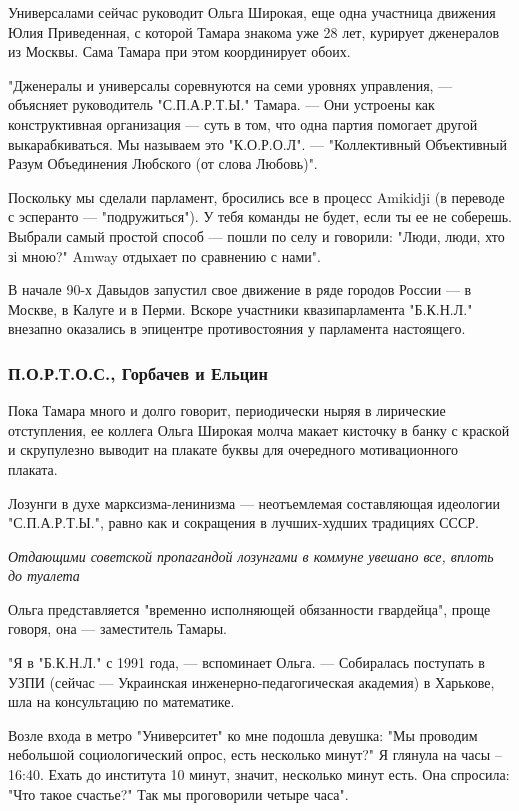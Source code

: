 Универсалами сейчас руководит Ольга Широкая, еще одна участница движения Юлия
Приведенная, с которой Тамара знакома уже 28 лет, курирует дженералов из
Москвы. Сама Тамара при этом координирует обоих.

"Дженералы и универсалы соревнуются на семи уровнях управления, --- объясняет
руководитель "С.П.А.Р.Т.Ы." Тамара. --- Они устроены как конструктивная
организация --- суть в том, что одна партия помогает другой выкарабкиваться. Мы
называем это "К.О.Р.О.Л". --- "Коллективный Объективный Разум Объединения
Любского (от слова Любовь)". 

Поскольку мы сделали парламент, бросились все в процесс Amikidji (в переводе с
эсперанто --- "подружиться"). У тебя команды не будет, если ты ее не соберешь.
Выбрали самый простой способ --- пошли по селу и говорили: "Люди, люди, хто зі
мною?" Amway отдыхает по сравнению с нами".

В начале 90-х Давыдов запустил свое движение в ряде городов России --- в Москве,
в Калуге и в Перми. Вскоре участники квазипарламента "Б.К.Н.Л." внезапно
оказались в эпицентре противостояния у парламента настоящего.

\subsubsection{П.О.Р.Т.О.С., Горбачев и Ельцин}

Пока Тамара много и долго говорит, периодически ныряя в лирические отступления,
ее коллега Ольга Широкая молча макает кисточку в банку с краской и скрупулезно
выводит на плакате буквы для очередного мотивационного плаката. 

Лозунги в духе марксизма-ленинизма --- неотъемлемая составляющая идеологии
"С.П.А.Р.Т.Ы.", равно как и сокращения в лучших-худших традициях СССР.

\emph{Отдающими советской пропагандой лозунгами в коммуне увешано все, вплоть до туалета}

Ольга представляется "временно исполняющей обязанности гвардейца", проще
говоря, она --- заместитель Тамары.

"Я в "Б.К.Н.Л." с 1991 года, --- вспоминает Ольга. --- Собиралась поступать в УЗПИ
(сейчас --- Украинская инженерно-педагогическая академия) в Харькове, шла на
консультацию по математике. 

Возле входа в метро "Университет" ко мне подошла девушка: "Мы проводим
небольшой социологический опрос, есть несколько минут?" Я глянула на часы –
16:40. Ехать до института 10 минут, значит, несколько минут есть. Она спросила:
"Что такое счастье?" Так мы проговорили четыре часа".

